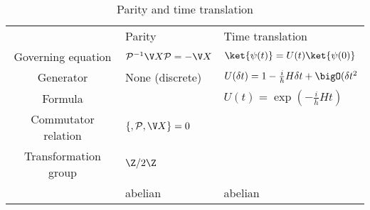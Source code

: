 \documentclass[a4paper]{article}
\newcommand*{\parity}{\mathcal{P}}
\theoremstyle{definition}
\begin{document}
\begin{landscape}
\begin{table}[htbp]
  \centering
  \begin{tabular}{|c|p{8cm}|p{8cm}|}
    \hline
    & Parity & Time translation \\
    Governing equation & \(\parity^{-1}\V X \parity = -\V X\) & \(\ket{\psi(t)} = U(t) \ket{\psi(0)}\) \\ \hline
    Generator & None (discrete) & \(U(\delta t) = 1- \frac{i}{\hbar}H\delta t + \bigO(\delta t^2\) \\ \hline
    Formula & & \(U(t) = \exp(-\frac{i}{h}Ht)\) \\ \hline
    Commutator relation & \(\{, \parity, \V X \} = 0\)& \\ \hline
    Transformation group & \(\Z/2\Z\) & \\ \hline
    & abelian & abelian \\ \hline
  \end{tabular}
  \caption{Parity and time translation}
  \label{tab:}
\end{table}
\end{landscape}
\pagestyle{plain}
\end{document}

